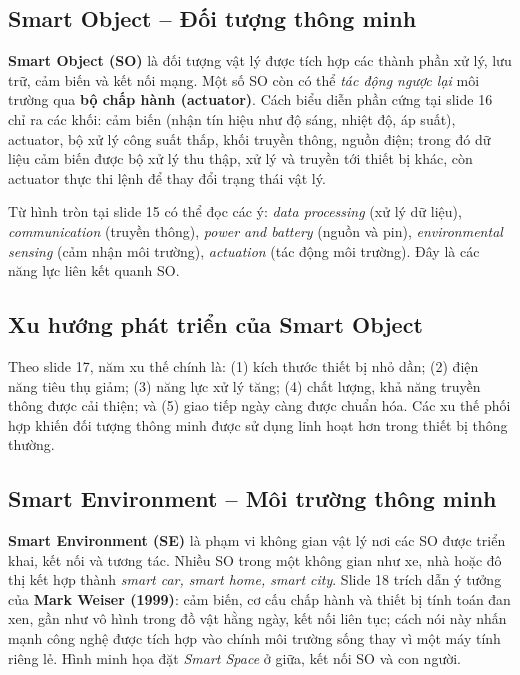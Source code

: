 \subsection{Smart Object -- Đối tượng thông minh}
\textbf{Smart Object (SO)} là đối tượng vật lý được tích hợp các thành phần xử lý, lưu trữ, cảm biến và kết nối mạng. Một số SO còn có thể \emph{tác động ngược lại} môi trường qua \textbf{bộ chấp hành (actuator)}. Cách biểu diễn phần cứng tại slide 16 chỉ ra các khối: cảm biến (nhận tín hiệu như độ sáng, nhiệt độ, áp suất), actuator, bộ xử lý công suất thấp, khối truyền thông, nguồn điện; trong đó dữ liệu cảm biến được bộ xử lý thu thập, xử lý và truyền tới thiết bị khác, còn actuator thực thi lệnh để thay đổi trạng thái vật lý.

Từ hình tròn tại slide 15 có thể đọc các ý: \emph{data processing} (xử lý dữ liệu), \emph{communication} (truyền thông), \emph{power and battery} (nguồn và pin), \emph{environmental sensing} (cảm nhận môi trường), \emph{actuation} (tác động môi trường). Đây là các năng lực liên kết quanh SO.

\subsection{Xu hướng phát triển của Smart Object}
Theo slide 17, năm xu thế chính là: (1) kích thước thiết bị nhỏ dần; (2) điện năng tiêu thụ giảm; (3) năng lực xử lý tăng; (4) chất lượng, khả năng truyền thông được cải thiện; và (5) giao tiếp ngày càng được chuẩn hóa. Các xu thế phối hợp khiến đối tượng thông minh được sử dụng linh hoạt hơn trong thiết bị thông thường.

\subsection{Smart Environment -- Môi trường thông minh}
\textbf{Smart Environment (SE)} là phạm vi không gian vật lý nơi các SO được triển khai, kết nối và tương tác. Nhiều SO trong một không gian như xe, nhà hoặc đô thị kết hợp thành \emph{smart car, smart home, smart city}. Slide 18 trích dẫn ý tưởng của \textbf{Mark Weiser (1999)}: cảm biến, cơ cấu chấp hành và thiết bị tính toán đan xen, gần như vô hình trong đồ vật hằng ngày, kết nối liên tục; cách nói này nhấn mạnh công nghệ được tích hợp vào chính môi trường sống thay vì một máy tính riêng lẻ. Hình minh họa đặt \emph{Smart Space} ở giữa, kết nối SO và con người.

